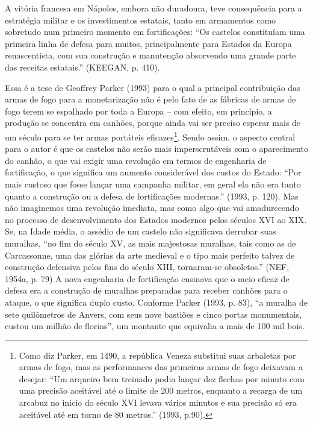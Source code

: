 A vitória francesa em Nápoles, embora não duradoura, teve consequência
para a estratégia militar e os investimentos estatais, tanto em
armamentos como sobretudo num primeiro momento em fortificações: ``Os
castelos constituíam uma primeira linha de defesa para muitos,
principalmente para Estados da Europa renascentista, com sua construção
e manutenção absorvendo uma grande parte das receitas estatais.''
(KEEGAN, p. 410).

Essa é a tese de Geoffrey Parker (1993) para o qual a principal
contribuição das armas de fogo para a monetarização não é pelo fato de
as fábricas de armas de fogo terem se espalhado por toda a Europa -- com
efeito, em princípio, a produção se concentra em canhões, porque ainda
vai ser preciso esperar mais de um século para se ter armas portáteis
eficazes\footnote{Como diz Parker, em 1490, a república Veneza substitui
  suas arbaletas por armas de fogo, mas as performances das primeiras
  armas de fogo deixavam a desejar: ``Um arqueiro bem treinado podia
  lançar dez flechas por minuto com uma precisão aceitável até o limite
  de 200 metros, enquanto a recarga de um arcabuz no início do século
  XVI levava vários minutos e sua precisão só era aceitável até em torno
  de 80 metros.'' (1993, p.90).}. Sendo assim, o aspecto central para o
autor é que os castelos não serão mais imperscrutáveis com o
aparecimento do canhão, o que vai exigir uma revolução em termos de
engenharia de fortificação, o que significa um aumento considerável dos
custos do Estado: ``Por mais custoso que fosse lançar uma campanha
militar, em geral ela não era tanto quanto a construção ou a defesa de
fortificações modernas.'' (1993, p. 120). Mas não imaginemos uma
revolução imediata, mas como algo que vai amadurecendo no processo de
desenvolvimento dos Estados modernos pelos séculos XVI ao XIX. Se, na
Idade média, o assédio de um castelo não significava derrubar suas
muralhas, ``no fim do século XV, as mais majestosas muralhas, tais como
as de Carcassonne, uma das glórias da arte medieval e o tipo mais
perfeito talvez de construção defensiva pelos fins do século XIII,
tornaram-se obsoletos.'' (NEF, 1954a, p. 79) A nova engenharia de
fortificação ensinava que o meio eficaz de defesa era a construção de
muralhas preparadas para receber canhões para o ataque, o que significa
duplo custo. Conforme Parker (1993, p. 83), ``a muralha de sete
quilômetros de Anvers, com seus nove bastiões e cinco portas
monumentais, custou um milhão de florins'', um montante que equivalia a
mais de 100 mil bois.

